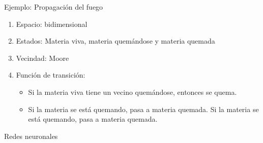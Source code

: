 \begin{frame}{Ejemplo: Propagación del fuego}
	\begin{center}
		\begin{enumerate}
			\item Espacio: bidimensional
			\item Estados: Materia viva, materia quemándose y materia quemada
			\item Vecindad: Moore
			\item Función de transición: 
			\begin{itemize}
				\item Si la materia viva tiene un vecino quemándose, entonces se quema.
				\item Si la materia se está quemando, pasa a materia quemada. Si la materia se está quemando, pasa a materia quemada.
			\end{itemize}
		\end{enumerate}
	\end{center}
	
\end{frame}

\begin{frame}{Redes neuronales}
	\begin{center}
	\end{center}

\end{frame}


